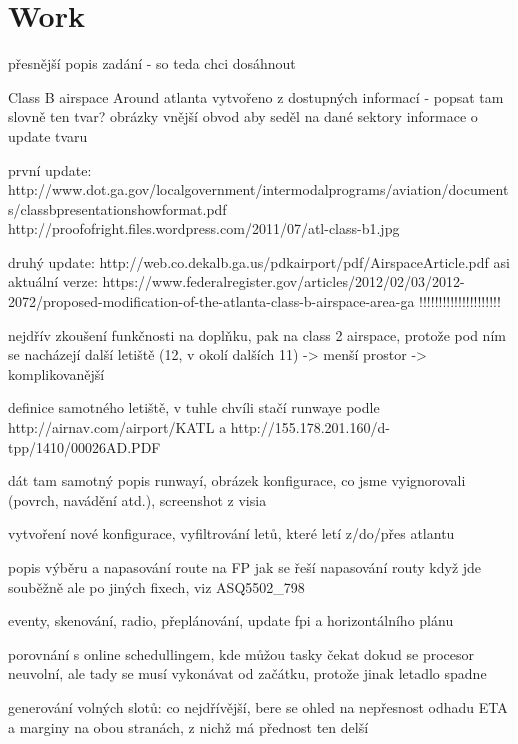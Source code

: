 \chapter{Work}

přesnější popis zadání - so teda chci dosáhnout

Class B airspace Around atlanta
vytvořeno z dostupných informací - popsat tam slovně ten tvar?
obrázky
vnější obvod aby seděl na dané sektory
informace o update tvaru

první update:
http://www.dot.ga.gov/localgovernment/intermodalprograms/aviation/documents/classbpresentationshowformat.pdf
http://proofofright.files.wordpress.com/2011/07/atl-class-b1.jpg

druhý update:
http://web.co.dekalb.ga.us/pdkairport/pdf/AirspaceArticle.pdf
asi aktuální verze:
https://www.federalregister.gov/articles/2012/02/03/2012-2072/proposed-modification-of-the-atlanta-class-b-airspace-area-ga !!!!!!!!!!!!!!!!!!!!!

nejdřív zkoušení funkčnosti na doplňku, pak na class 2 airspace, protože pod ním se nacházejí další letiště (12, v okolí dalších 11) -> menší prostor -> komplikovanější



definice samotného letiště,
v tuhle chvíli stačí runwaye
podle
http://airnav.com/airport/KATL a http://155.178.201.160/d-tpp/1410/00026AD.PDF

dát tam samotný popis runwayí, obrázek konfigurace, co jsme vyignorovali (povrch, navádění atd.), screenshot z visia 





vytvoření nové konfigurace, vyfiltrování letů, které letí z/do/přes atlantu

popis výběru a napasování route na FP
jak se řeší napasování routy když jde souběžně ale po jiných fixech, viz ASQ5502_798


eventy, skenování, radio, přeplánování, update fpi a horizontálního plánu

porovnání s online schedullingem, kde můžou tasky čekat dokud se procesor neuvolní, ale tady se musí vykonávat od začátku, protože jinak letadlo spadne

generování volných slotů: co nejdřívější, bere se ohled na nepřesnost odhadu ETA a marginy na obou stranách, z nichž má přednost ten delší